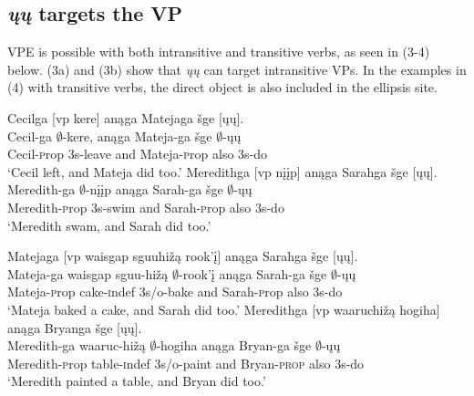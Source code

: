 \documentclass[output=paper]{LSP/langsci}
\begin{document}
\subsection{\emph{\k{u}\k{u}} targets the VP}

VPE is possible with both intransitive and transitive verbs, as seen in (3-4) below. (3a) and (3b) show that \emph{\k{u}\k{u}} can target intransitive VPs. In the examples in (4) with transitive verbs, the direct object is also included in the ellipsis site.

\begin{exe}
\ex
\begin{xlist}
\ex
\glll Cecilga {\textsc [vp} kere{\textsc ]} an\k{a}ga Matejaga \v{s}ge {\textsc [}\k{u}\k{u}{\textsc ]}.\\
Cecil-ga {} $\emptyset$-kere, an\k{a}ga Mateja-ga \v{s}ge $\emptyset$-\k{u}\k{u}\\
Cecil-{\textsc prop} {} {\textsc 3s}-leave and Mateja-{\textsc prop} also {\textsc 3s}-do\\
\trans `Cecil left, and Mateja did too.'
\ex
\glll Meredithga {\textsc [vp} n\k{i}\k{i}p{\textsc ]} an\k{a}ga Sarahga \v{s}ge {\textsc [}\k{u}\k{u}{\textsc ]}.\\
Meredith-ga {} $\emptyset$-n\k{i}\k{i}p an\k{a}ga Sarah-ga \v{s}ge $\emptyset$-\k{u}\k{u}\\
Meredith-{\textsc prop} {} {\textsc 3s}-swim and Sarah-{\textsc prop} also {\textsc 3s}-do\\
\trans `Meredith swam, and Sarah did too.'
\end{xlist}
\end{exe}

\begin{exe}
\ex
\begin{xlist}
\ex
\glll Matejaga {\textsc [vp} {waisgap sguuhi\v{z}\k{a}} rook'\k{i}{\textsc ]} an\k{a}ga Sarahga \v{s}ge {\textsc [}\k{u}\k{u}{\textsc ]}.\\
Mateja-ga {} {waisgap sguu-hi\v{z}\k{a}} $\emptyset$-rook'\k{i} an\k{a}ga Sarah-ga \v{s}ge $\emptyset$-\k{u}\k{u}\\
Mateja-{\textsc prop} {} cake-{\textsc indef} {\textsc 3s/o}-bake and Sarah-{\textsc prop} also {\textsc 3s}-do\\
\trans `Mateja baked a cake, and Sarah did too.'
\ex
\glll Meredithga {\textsc [vp} waaruchi\v{z}\k{a} hogiha{\textsc ]} an\k{a}ga Bryanga \v{s}ge {\textsc [}\k{u}\k{u}{\textsc ]}.\\
Meredith-ga {} waaruc-hi\v{z}\k{a} $\emptyset$-hogiha an\k{a}ga Bryan-ga \v{s}ge $\emptyset$-\k{u}\k{u}\\
Meredith-{\textsc prop} {} table-{\textsc indef} {\textsc 3s/o}-paint and Bryan-\textsc{prop} also {\textsc 3s}-do\\
\trans `Meredith painted a table, and Bryan did too.'
\end{xlist}
\end{exe}
\end{document}
